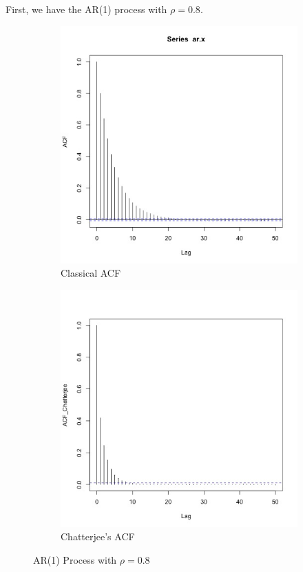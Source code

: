 \documentclass{article}
\begin{document}
	First, we have the AR(1) process with $\rho = 0.8$.
	\begin{figure}[H]
		\centering
		\begin{subfigure}[b]{0.4\linewidth}
			\includegraphics[width=\linewidth]{acf_ar.jpg}
			\caption{Classical ACF}
		\end{subfigure}
		\begin{subfigure}[b]{0.4\linewidth}
			\includegraphics[width=\linewidth]{acf_ar_chatterjee.jpg}
			\caption{Chatterjee's ACF}
		\end{subfigure}
		\caption{AR(1) Process with $\rho = 0.8$}
		\label{fig:ar_acf}
	\end{figure}
\end{document}
